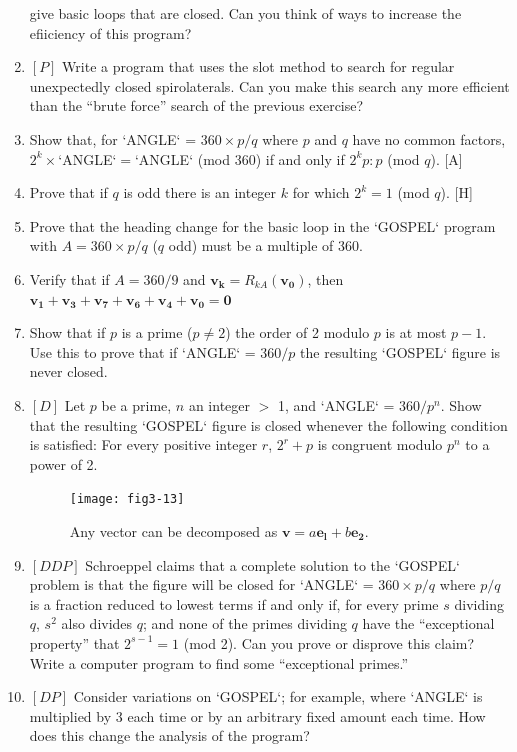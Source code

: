 \documentclass{book}
\begin{document}
\begin{enumerate}
give basic loops that are closed. Can you think of ways to increase the
efiiciency of this program?
\item $[P]$ Write a program that uses the slot method to search for regular
unexpectedly closed spirolaterals. Can you make this search any more
efficient than the ``brute force'' search of the previous exercise?
\item Show that, for \textsc{`ANGLE`} = $360 \times p/ q$ where $p$ and $q$ have no common
factors, $2^{k} \times$\textsc{`ANGLE`}$=$\textsc{`ANGLE`} (mod 360) if and only if $2^kp : p$ (mod $q$). [A]
\item Prove that if $q$ is odd there is an integer $k$ for which $2^k = 1$ (mod $q$).
[H]
\item Prove that the heading change for the basic loop in the \textsc{`GOSPEL`}
program with $A = 360 \times p/q$ ($q$ odd) must be a multiple of 360.  
\item Verify that if $A = 360/9$ and $\mathbf{v_k} = R_{kA}(\mathbf{v_0})$, then
$\mathbf{v_1} + \mathbf{v_3} + \mathbf{v_7} + \mathbf{v_6} + \mathbf{v_4} + \mathbf{v_0} = \mathbf{0}$  
\item Show that if $p$ is a prime ($p \not=  2$) the order of 2 modulo $p$ is at most
$p - 1$. Use this to prove that if \textsc{`ANGLE`} = $360/p$ the resulting \textsc{`GOSPEL`}
figure is never closed.  
\item $[D]$ Let $p$ be a prime, $n$ an integer $>$ 1, and \textsc{`ANGLE`} = $360/p^n$.
Show that the resulting \textsc{`GOSPEL`} figure is closed whenever the following
condition is satisfied: For every positive integer $r$, $2^r + p$ is congruent
modulo $p^n$ to a power of 2.

\begin{figure}
\begin{center}
\texttt{[image: fig3-13]}
\caption{Any vector can be decomposed as $\mathbf{v} = a\mathbf{e_l} + b\mathbf{e_2}$.}
\end{center}
\end{figure}

\item $[DDP]$ Schroeppel claims that a complete solution to the \textsc{`GOSPEL`}
problem is that the figure will be closed for \textsc{`ANGLE`} = $360 \times p/q$ where
$p/q$ is a fraction reduced to lowest terms if and only if, for every prime $s$
dividing $q$, $s^2$ also divides $q$; and none of the primes dividing $q$ have the
``exceptional property'' that $2^{s-1} = 1$ (mod 2). Can you prove or
disprove this claim? Write a computer program to find some ``exceptional
primes.''
\item $[DP]$ Consider variations on \textsc{`GOSPEL`}; for example, where \textsc{`ANGLE`} is
multiplied by 3 each time or by an arbitrary fixed amount each time.
How does this change the analysis of the program?
\end{enumerate}
\end{document}
